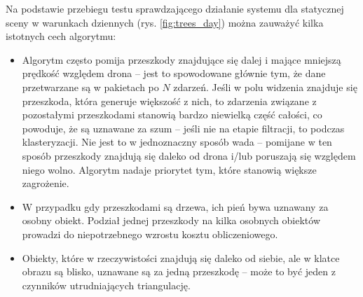  Na podstawie przebiegu testu sprawdzającego działanie systemu dla statycznej sceny w warunkach dziennych (rys. \ref{fig:trees_day}) można zauważyć kilka istotnych cech algorytmu:
 \begin{itemize}
     \item Algorytm często pomija przeszkody znajdujące się dalej i mające mniejszą prędkość względem drona -- jest to spowodowane głównie tym, że dane przetwarzane są w pakietach po $N$ zdarzeń. Jeśli w polu widzenia znajduje się przeszkoda, która generuje większość z nich, to zdarzenia związane z pozostałymi przeszkodami stanowią bardzo niewielką część całości, co powoduje, że są uznawane za szum -- jeśli nie na etapie filtracji, to podczas klasteryzacji. Nie jest to w jednoznaczny sposób wada -- pomijane w ten sposób przeszkody znajdują się daleko od drona i/lub poruszają się względem niego wolno. Algorytm nadaje priorytet tym, które stanowią większe zagrożenie.
     \item W przypadku gdy przeszkodami są drzewa, ich pień bywa uznawany za osobny obiekt. Podział jednej przeszkody na kilka osobnych obiektów prowadzi do niepotrzebnego wzrostu kosztu obliczeniowego.
     \item Obiekty, które w rzeczywistości znajdują się daleko od siebie, ale w klatce obrazu są blisko, uznawane są za jedną przeszkodę -- może to być jeden z czynników utrudniających triangulację.
 \end{itemize}


